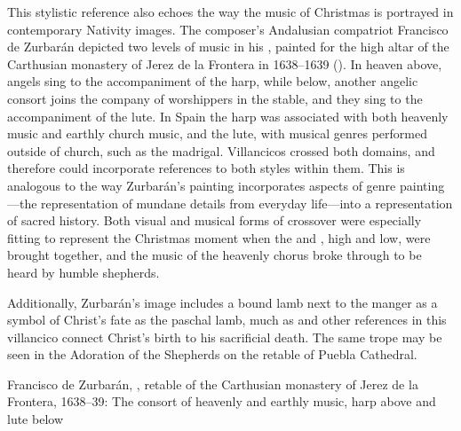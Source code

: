 
This stylistic reference also echoes the way the music of Christmas is portrayed
in contemporary Nativity images.
The composer's Andalusian compatriot Francisco de Zurbarán depicted two levels
of music in his , painted for the high altar
of the Carthusian monastery of Jerez de la Frontera in 1638--1639
().%
    \Autocite
    [Gutiérrez de Padilla had been chapelmaster of the cathedral of Jerez de la
    Frontera in 1612--1616;][]
    {Gembero:Padilla}
In heaven above, angels sing to the accompaniment of the harp, while below,
another angelic consort joins the company of worshippers in the stable, and they
sing to the accompaniment of the lute.
In Spain the harp was associated with both heavenly music and earthly church
music, and the lute, with musical genres performed outside of church, such as
the madrigal.
Villancicos crossed both domains, and therefore could incorporate references to
both styles within them.
This is analogous to the way Zurbarán's painting incorporates aspects of genre
painting---the representation of mundane details from everyday life---into a
representation of sacred history.%
    \Autocites
    [31]{Sanchez:Zurbaran}
    {Cherry:Bodegon}
    {Haraszti-Takacs:Genre}
Both visual and musical forms of crossover were especially fitting to represent
the Christmas moment when the  and , high and low,
were brought together, and the music of the heavenly chorus broke through to be
heard by humble shepherds.%
\begin{Footnote}
    Additionally, Zurbarán's image includes a bound lamb next to the manger as a
    symbol of Christ's fate as the paschal lamb, much as  and other references in this villancico connect Christ's birth
    to his sacrificial death.
    The same trope may be seen in the Adoration of the Shepherds on the retable
    of Puebla Cathedral.
\end{Footnote}


{Francisco de Zurbarán, , retable of the
Carthusian monastery of Jerez de la Frontera, 1638--39: The consort of heavenly
and earthly music, harp above and lute below}

